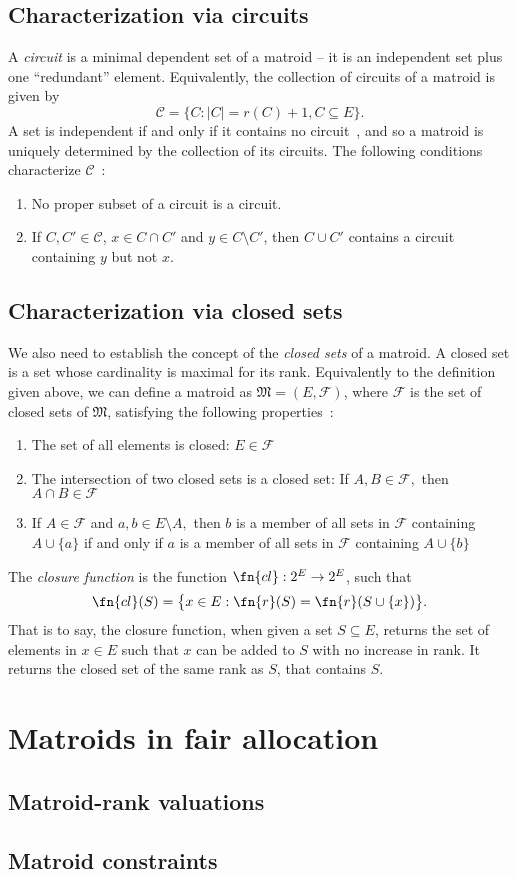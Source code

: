 \subsection{Characterization via circuits}
A \textit{circuit} is a minimal dependent set of a matroid -- it is an independent set plus one ``redundant'' element. Equivalently, the collection of circuits of a matroid is given by
$$\mathcal{C} = \bigl\{ C : |C| = r(C) + 1, C\subseteq E \bigr\}.$$
A set is independent if and only if it contains no circuit~\cite{schrijver-2003}, and so a matroid is uniquely determined by the collection of its circuits. The following conditions characterize $\mathcal{C}$~\cite{whitney-1935}:
\begin{enumerate}
  \item No proper subset of a circuit is a circuit.
  \item If $C, C'\in\mathcal{C}$, $x\in C\cap C'$ and $y\in C\setminus C'$, then $C\cup C'$ contains a circuit containing $y$ but not $x$.
\end{enumerate}

\subsection{Characterization via closed sets}

We also need to establish the concept of the \textit{closed sets} of a matroid. A closed set is a set whose cardinality is maximal for its rank. Equivalently to the definition given above, we can define a matroid as $\mathfrak{M} = (E, \mathcal{F})$, where $\mathcal{F}$ is the set of closed sets of $\mathfrak{M}$, satisfying the following properties~\cite{knuth-1975}:

\begin{enumerate}
  \item The set of all elements is closed: $E \in \mathcal{F}$
  \item The intersection of two closed sets is a closed set: If $A,B \in \mathcal{F},$ then $A \cap B \in \mathcal{F}$
  \item If $A \in \mathcal{F}$ and $a,b \in E \setminus A,$ then $b$ is a member of all sets in $\mathcal{F}$ containing $A \cup \{a\}$ if and only if $a$ is a member of all sets in $\mathcal{F}$ containing $A \cup \{b\}$
\end{enumerate}

The \textit{closure function} is the function $\fn{cl} : 2^E \to 2^E$, such that $$\fn{cl}(S) = \bigl\{ x \in E : \fn{r}(S) = \fn{r}(S \cup \{x\}) \bigr\}.$$ That is to say, the closure function, when given a set $S \subseteq E$, returns the set of elements in $x \in E$ such that $x$ can be added to $S$ with no increase in rank. It returns the closed set of the same rank as $S$, that contains $S$.


\section{Matroids in fair allocation}
\subsection{Matroid-rank valuations}
\subsection{Matroid constraints}
